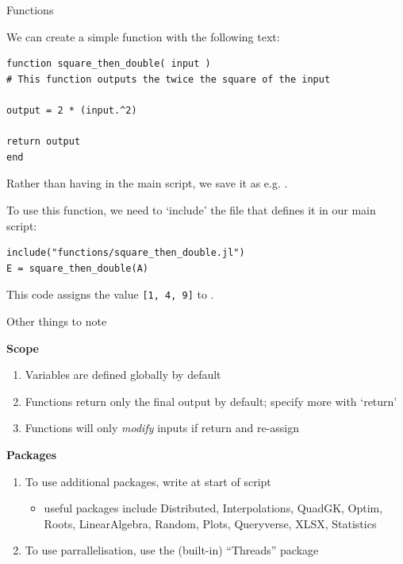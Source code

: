 \documentclass[aspectratio=169]{beamer}
\begin{document}
\begin{frame}[fragile]{Functions}

We can create a simple function with the following text:
\vspace{-0.5cm}
\begin{lstlisting}
function square_then_double( input )
# This function outputs the twice the square of the input

output = 2 * (input.^2)

return output
end
\end{lstlisting}
\vspace{-0.5cm}
Rather than having in the main script, we save it as e.g. .

\vspace{0.5cm}

To use this function, we need to `include' the file that defines it in our main script:
\vspace{-0.5cm}
\begin{lstlisting}
include("functions/square_then_double.jl")
E = square_then_double(A)
\end{lstlisting}
\vspace{-0.5cm}
This code assigns the value \texttt{[1, 4, 9]} to .

\end{frame}

\begin{frame}{Other things to note}

\textbf{Scope}
\begin{enumerate}
	\item Variables are defined globally by default
	\item Functions return only the final output by default; specify more with `return'
	\item Functions will only \textit{modify} inputs if return and re-assign
\end{enumerate}

\vspace{0.5cm} 

\textbf{Packages}
\begin{enumerate}
	\item To use additional packages, write  at start of script
	\begin{itemize}
		\item useful packages include Distributed, Interpolations, QuadGK, Optim, Roots, LinearAlgebra, Random, Plots, Queryverse, XLSX, Statistics
	\end{itemize}
	\item To use parrallelisation, use the (built-in) ``Threads'' package
\end{enumerate}

\end{frame}
\end{document}
